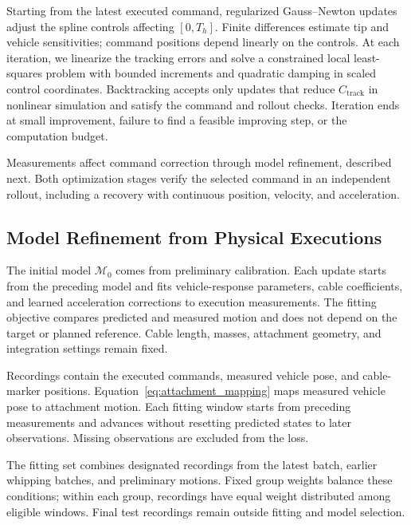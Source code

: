 Starting from the latest executed command, regularized
Gauss--Newton updates adjust the spline controls affecting
$[0,T_h]$. Finite differences estimate tip and vehicle sensitivities;
command positions depend linearly on the controls. At each iteration,
we linearize the tracking errors and solve a constrained local
least-squares problem with bounded increments and quadratic
damping in scaled control coordinates. Backtracking accepts only
updates that reduce $C_{\mathrm{track}}$ in nonlinear simulation
and satisfy the command and rollout checks. Iteration ends at
small improvement, failure to find a feasible improving step,
or the computation budget.

Measurements affect command correction through model refinement,
described next. Both optimization stages verify the selected command
in an independent rollout, including a recovery with continuous
position, velocity, and acceleration.

\subsection{Model Refinement from Physical Executions}
\label{subsec:model_refinement}

The initial model $\mathcal M_0$ comes from preliminary calibration.
Each update starts from the preceding model and fits vehicle-response
parameters, cable coefficients, and learned acceleration corrections
to execution measurements. The fitting objective compares predicted and measured motion and does not
depend on the target or planned reference. Cable length, masses,
attachment geometry, and integration settings remain fixed.

Recordings contain the executed commands, measured vehicle pose,
and cable-marker positions. Equation~\eqref{eq:attachment_mapping}
maps measured vehicle pose to attachment motion. Each fitting
window starts from preceding measurements and advances without
resetting predicted states to later observations. Missing
observations are excluded from the loss.

The fitting set combines designated recordings from the latest
batch, earlier whipping batches, and preliminary motions.
Fixed group weights balance these conditions; within each group,
recordings have equal weight distributed among eligible windows.
Final test recordings remain outside fitting and model selection.


